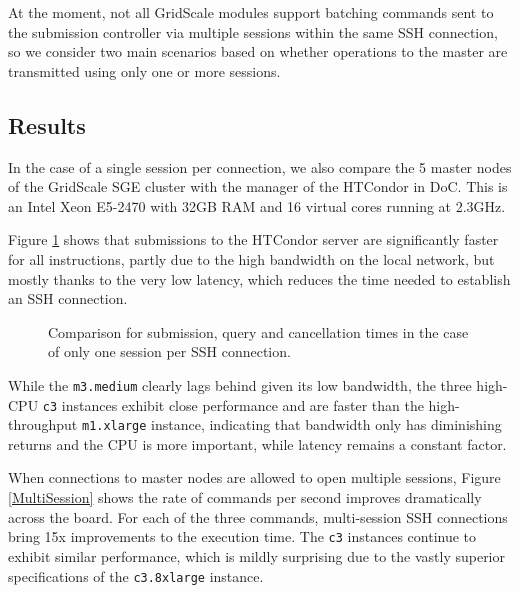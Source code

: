 At the moment, not all GridScale modules support batching commands sent to the submission controller via multiple sessions within the same SSH connection, so we consider two main scenarios based on whether operations to the master are transmitted using only one or more sessions.

\subsection{Results}

In the case of a single session per connection, we also compare the 5 master nodes of the GridScale SGE cluster with the manager of the HTCondor in DoC. This is an Intel Xeon E5-2470 with 32GB RAM and 16 virtual cores running at 2.3GHz.

Figure \ref{SingleSession} shows that submissions to the HTCondor server are significantly faster for all instructions, partly due to the high bandwidth on the local network, but mostly thanks to the very low latency, which reduces the time needed to establish an SSH connection. 

\begin{figure}[h]
	\centering
	\endminipage \vfill
	\endminipage \hfill
	\endminipage \hfill
	\caption{Comparison for submission, query and cancellation times in the case of only one session per SSH connection.}
	\label{SingleSession}
\end{figure}

While the \verb|m3.medium| clearly lags behind given its low bandwidth, the three high-CPU \verb|c3| instances exhibit close performance and are faster than the high-throughput \verb|m1.xlarge| instance, indicating that bandwidth only has diminishing returns and the CPU is more important, while latency remains a constant factor.


When connections to master nodes are allowed to open multiple sessions, Figure \ref{MultiSession}  shows the rate of commands per second improves dramatically across the board. For each of the three commands, multi-session SSH connections bring 15x improvements to the execution time. The \verb|c3| instances continue to exhibit similar performance, which is mildly surprising due to the vastly superior specifications of the \verb|c3.8xlarge| instance.

